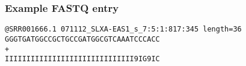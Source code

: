 \documentclass{beamer}
\begin{document}
\begin{frame}[fragile]
  \frametitle{Example FASTQ entry}
\begin{verbatim}
@SRR001666.1 071112_SLXA-EAS1_s_7:5:1:817:345 length=36
GGGTGATGGCCGCTGCCGATGGCGTCAAATCCCACC
+
IIIIIIIIIIIIIIIIIIIIIIIIIIIIII9IG9IC
\end{verbatim}
\end{frame}







\end{document}
